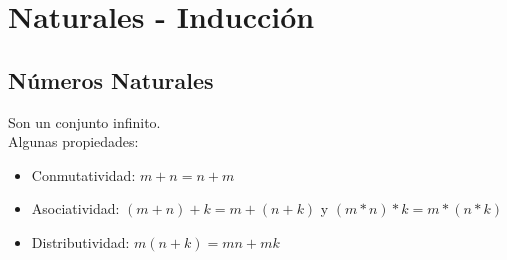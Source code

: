\documentclass[10pt,a4paper]{article}
\begin{document}
\section*{Naturales - Inducción}
\subsection*{Números Naturales}
Son un conjunto infinito. \\
Algunas propiedades:
\begin{itemize}
    \item Conmutatividad: $ m+n = n+m$
    \item Asociatividad: $(m+n)+k = m+(n+k)$ y $ (m\ast n)\ast k = m\ast (n\ast k)$
    \item Distributividad: $m(n+k) = mn + mk$
\end{itemize}
\end{document}
